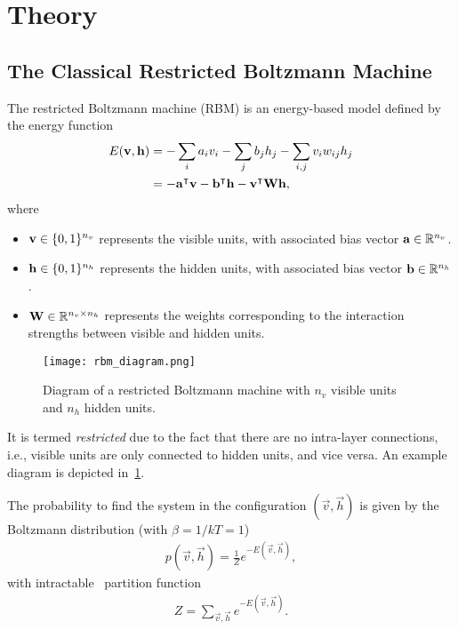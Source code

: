 \section{Theory}
\subsection{The Classical Restricted Boltzmann Machine}
The restricted Boltzmann machine (RBM) is an energy-based model defined by the energy function~\cite{goodfellow_deep_learning}
\begin{align}
\begin{split}
    \label{eq:rbm_energy}
    E(\mathbf{v}, \mathbf{h})
        &= -\sum_i a_i v_i - \sum_j b_j h_j - \sum_{i,j} v_i w_{ij} h_j \\
        &= -\mathbf{a}^\intercal\mathbf{v} - \mathbf{b}^\intercal\mathbf{h} - \mathbf{v}^\intercal\mathbf{W}\mathbf{h},
\end{split}
\end{align}
where
\begin{itemize}
    \item \( \mathbf{v} \in \{0,1\}^{n_v} \) represents the visible units, with associated bias vector \( \mathbf{a} \in \mathbb{R}^{n_v} \).
    \item \( \mathbf{h} \in \{0,1\}^{n_h} \) represents the hidden units, with associated bias vector \( \mathbf{b} \in \mathbb{R}^{n_h} \).
    \item \( \mathbf{W} \in \mathbb{R}^{n_v \times n_h} \) represents the weights corresponding to the interaction strengths between visible and hidden units.
\end{itemize}

\begin{figure}[!htb]
    \begin{center}
        \texttt{[image: rbm\_diagram.png]}
    \end{center}
    \caption{Diagram of a restricted Boltzmann machine with \( n_v \) visible units and \( n_h \) hidden units.}
    \label{fig:rbm_diagram}
\end{figure}

It is termed \textit{restricted} due to the fact that there are no intra-layer connections, i.e., visible units are only connected to hidden units, and vice versa.
An example diagram is depicted in~\cref{fig:rbm_diagram}.

The probability to find the system in the configuration \( (\vec{v},\vec{h}) \) is given by the Boltzmann distribution (with \( \beta = 1/kT = 1 \))
\begin{align}
    \label{eq:rbm_joint_probability}
    p(\vec{v}, \vec{h}) = \frac{1}{Z} e^{-E(\vec{v},\vec{h})},
\end{align}
with intractable~\cite{long_servedio_2010} partition function
\begin{align}
    \label{eq:rbm_partition_function}
    Z = \sum_{\vec{v},\vec{h}} e^{-E(\vec{v},\vec{h})}.
\end{align}

